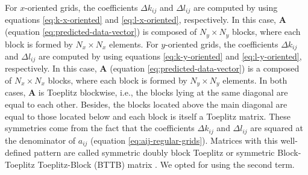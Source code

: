 \documentclass[manuscript,revised]{geophysics}
\begin{document}
For $x$-oriented grids, the coefficients $\Delta k_{ij}$ and $\Delta l_{ij}$ are 
computed by using equations \ref{eq:k-x-oriented} and \ref{eq:l-x-oriented}, respectively.
In this case, $\mathbf{A}$ (equation \ref{eq:predicted-data-vector}) is 
composed of $N_{y} \times N_{y}$ blocks, where each block is formed by $N_{x} \times N_{x}$ elements.
For $y$-oriented grids, the coefficients $\Delta k_{ij}$ and $\Delta l_{ij}$ are 
computed by using equations \ref{eq:k-y-oriented} and \ref{eq:l-y-oriented}, respectively.
In this case, $\mathbf{A}$ (equation \ref{eq:predicted-data-vector}) is a 
composed of $N_{x} \times N_{x}$ blocks, where each block is formed by $N_{y} \times N_{y}$ elements.
In both cases, $\mathbf{A}$ is Toeplitz blockwise, i.e., the blocks lying at the same diagonal 
are equal to each other.
Besides, the blocks located above the main diagonal are equal to those 
located below and each block is itself a Toeplitz matrix.
These symmetries come from the fact that the coefficients
$\Delta k_{ij}$ and $\Delta l_{ij}$ are squared at the denominator of 
$a_{ij}$ (equation \ref{eq:aij-regular-grids}).
Matrices with this well-defined pattern are called symmetric doubly block 
Toeplitz \citep[][ p. 28]{jain1989} or symmetric Block-Toeplitz Toeplitz-Block (BTTB) 
matrix \citep[][ p. 67]{chan-jin2007}. We opted for using the second term.
\end{document}

